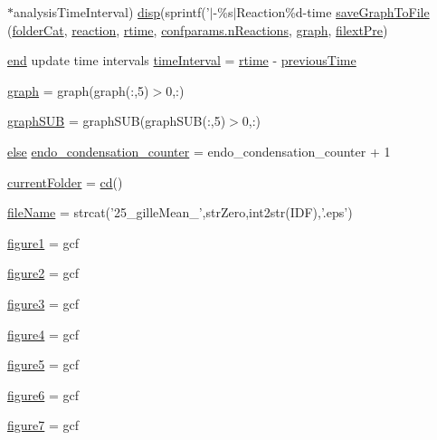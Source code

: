 \begin{DoxyCompactItemize}
$\ast$analysis\+Time\+Interval) \hyperlink{a00029_a609f02c862f2843febf3408f688be8e8}{disp}(sprintf('$\vert$-\/\%s$\vert$Reaction\%d-\/time \hyperlink{a00028_a95b8ff8a27bbc7e771fa2fdd279f2465}{save\+Graph\+To\+File} (\hyperlink{a00028_ac4793cb55101110d228ded89ce9caa48}{folder\+Cat}, \hyperlink{a00028_a4ba2ecb46f808729569ecce2cc1d34c6}{reaction}, \hyperlink{a00028_afc6b38657a313b9f1de2ee356910b6ee}{rtime}, \hyperlink{a00113_a8d704532b4b419f1428cb078bb5c7ffe}{confparams.\+n\+Reactions}, \hyperlink{a00028_a2745e24fec2a44d51f4452beb1596bd3}{graph}, \hyperlink{a00028_a527736a425f4f7ead2c2dc9d7b479346}{filext\+Pre})
\item 
\hyperlink{a00025_afb358f48b1646c750fb9da6c6585be2b}{end} update time intervals \hyperlink{a00028_a30a404fc0b2d3c996251dfd4adf5ec51}{time\+Interval} = \hyperlink{a00028_afc6b38657a313b9f1de2ee356910b6ee}{rtime} -\/ \hyperlink{a00028_a17b8652a085b5add031a40fb1c9a680e}{previous\+Time}
\item 
\hyperlink{a00028_a91819eaefb434ac459f17b3caa03713d}{graph} = graph(graph(\+:,5)$>$0,\+:)
\item 
\hyperlink{a00028_a0c738fa68cf19f3aeef6b6a7a723577c}{graph\+S\+U\+B} = graph\+S\+U\+B(graph\+S\+U\+B(\+:,5)$>$0,\+:)
\item 
\hyperlink{a00031_af5946383720aa572eb93e1e63afc23c2}{else} \hyperlink{a00028_ac7610da79e174cac91899b5a15014265}{endo\+\_\+condensation\+\_\+counter} = endo\+\_\+condensation\+\_\+counter + 1
\item 
\hyperlink{a00028_af393966a41271e721a03e544a1650f4a}{current\+Folder} = \hyperlink{a00113_abe327856a9ee2f30f3ccafe4dc9edf5e}{cd}()
\item 
\hyperlink{a00028_acbece2625a541230e9f9091adca38c8c}{file\+Name} = strcat('25\+\_\+gille\+Mean\+\_\+',str\+Zero,int2str(\+I\+D\+F),'.\+eps')
\item 
\hyperlink{a00028_aa04641698301ef27b9562e1a03d697cf}{figure1} = gcf
\item 
\hyperlink{a00028_a185ece7ea03635f3e9f36bce457bc6b0}{figure2} = gcf
\item 
\hyperlink{a00028_a49c05716a1aa25ef47e7b2a3cc3b7362}{figure3} = gcf
\item 
\hyperlink{a00028_a3910d94d7f9d81634d5102442e25d603}{figure4} = gcf
\item 
\hyperlink{a00028_aacba0a23b9337f688d1a0fc707f49bb8}{figure5} = gcf
\item 
\hyperlink{a00028_a6d1dba2624229e06f705f5eaa6e11a9b}{figure6} = gcf
\item 
\hyperlink{a00028_ad893b16e514321b512ee5c11fb5b7b0d}{figure7} = gcf

\end{DoxyCompactItemize}
